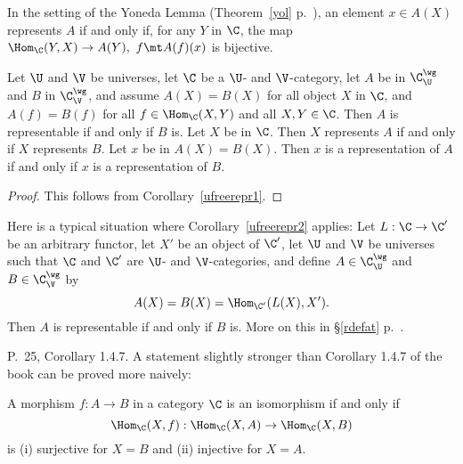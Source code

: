 \documentclass[12pt]{article}
\theoremstyle{remark}
\theoremstyle{definition}
\begin{document}
\begin{cor}
In the setting of the Yoneda Lemma (Theorem~\ref{yol} p.~), an element $x\in A(X)$ represents $A$ if and only if, for any $Y$ in $\C$, the map $\Hom_\C(Y,X)\to A(Y),\ f\mt A(f)(x)$ is bijective.
\end{cor}
\begin{cor}
Let $\U$ and $\V$ be universes, let $\C$ be a $\U$- and $\V$-category, let $A$ be in $\C^\wg_\U$ and $B$ in $\C^\wg_\V$, and assume $A(X)=B(X)$ for all object $X$ in $\C$, and $A(f)=B(f)$ for all $f\in\Hom_\C(X,Y)$ and all $X,Y\in\C$. Then $A$ is representable if and only if $B$ is. Let $X$ be in $\C$. Then $X$ represents $A$ if and only if $X$ represents $B$. Let $x$ be in $A(X)=B(X)$. Then $x$ is a representation of $A$ if and only if $x$ is a representation of $B$. %

\end{cor}
\begin{proof}
This follows from Corollary~\ref{ufreerepr1}.
\end{proof}

Here is a typical situation where Corollary~\ref{ufreerepr2} applies: Let $L:\C\to\C'$ be an arbitrary functor, let $X'$ be an object of $\C'$, let $\U$ and $\V$ be universes such that $\C$ and $\C'$ are $\U$- and $\V$-categories, and define $A\in\C^\wg_\U$ and $B\in\C^\wg_\V$ by 
$$
A(X)=B(X)=\Hom_{\C'}(L(X),X').
$$ 
Then $A$ is representable if and only if $B$ is. More on this in \S\ref{rdefat} p.~.



P.~25, Corollary 1.4.7. A statement slightly stronger than Corollary 1.4.7 of the book can be proved more naively:

\begin{prop}
A morphism $f:A\to B$ in a category $\C$ is an isomorphism if and only if 
$$
\Hom_\C(X,f):\Hom_\C(X,A)\to\Hom_\C(X,B)
$$
is (i) surjective for $X=B$ and (ii) injective for $X=A$.
\end{prop}
\end{document}

